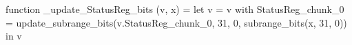 function _update_StatusReg_bits (v, x) = let v = { v with StatusReg_chunk_0 = update_subrange_bits(v.StatusReg_chunk_0, 31, 0, subrange_bits(x, 31, 0)) } in
  v
